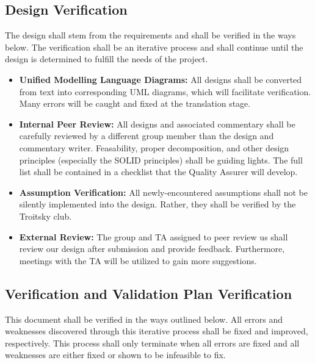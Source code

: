 \documentclass[12pt, titlepage]{article}
\begin{document}
\subsection{Design Verification}



The design shall stem from the requirements and shall be verified in the ways below. The verification shall be an iterative process and shall continue until the design
is determined to fulfill the needs of the project.

\begin{itemize}
  \item \textbf{Unified Modelling Language Diagrams:} All designs shall be converted from text into corresponding UML diagrams, which will facilitate verification. Many errors will be caught and fixed at the translation stage.
  \item \textbf{Internal Peer Review:} All designs and associated commentary shall be carefully reviewed by a different group member than the design and commentary writer. Feasability, proper decomposition, and other design principles (especially the SOLID principles) shall be guiding lights. The full list shall be contained in a checklist that the Quality Assurer will develop.
  \item \textbf{Assumption Verification:} All newly-encountered assumptions shall not be silently implemented into the design. Rather, they shall be verified by the Troitsky club.
  \item \textbf{External Review:} The group and TA assigned to peer review us shall review our design after submission and provide feedback. Furthermore, meetings with the TA will be utilized to gain more suggestions.
\end{itemize}
\subsection{Verification and Validation Plan Verification}





This document shall be verified in the ways outlined below. All errors and weaknesses discovered through this iterative process shall
be fixed and improved, respectively. This process shall only terminate when all errors are fixed and all weaknesses are either fixed or shown to be infeasible to fix.
\end{document}
